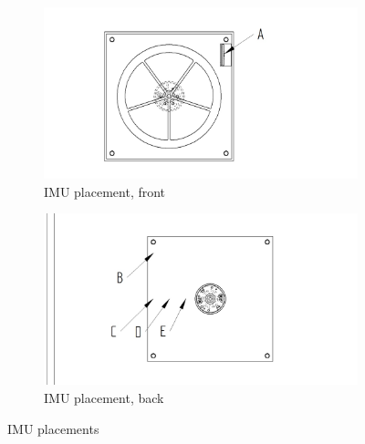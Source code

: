 \documentclass[a4paper,11pt]{kth-mag}
\begin{document}
\begin{figure}
\centering
\begin{subfigure}{.48\textwidth}
  \centering
  \includegraphics[trim=0.3cm 0.1cm 0.8cm 0.2cm, clip=true, width=\textwidth]{framsidaIMUpunkter.jpg}
  \caption{IMU placement, front}
  \label{Fig: IMU placement front2}
\end{subfigure}
\begin{subfigure}{.48\textwidth}
  \centering
  \includegraphics[trim=0.6cm 0.15cm 0.5cm 0.2cm, clip=true, width=\textwidth]{baksidaIMUpunkter.jpg}
  \caption{IMU placement, back}
  \label{Fig: IMU placement back2}
\end{subfigure}
\caption{IMU placements}
\label{Fig: IMU placement2}
\end{figure}
\end{document}
